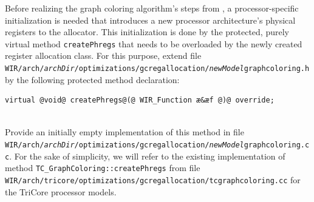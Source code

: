 Before realizing the graph coloring algorithm's steps from , a processor-specific initialization is needed that introduces a new processor architecture's physical registers to the allocator.
This initialization is done by the protected, purely virtual method \texttt{createPhregs} that needs to be overloaded by the newly created register allocation class.
For this purpose, extend file \texttt{WIR/arch/{\itshape archDir}/optimizations/gcregallocation/{\itshape newModel}\-graphcoloring.h} by the following protected method declaration: \\
\begin{lstlisting}[style=code,float=!ht,aboveskip=-0.8 \baselineskip,belowskip=-0.8 \baselineskip]
virtual @void@ createPhregs@(@ WIR_Function æ&æf @)@ override;
\end{lstlisting}
\\
Provide an initially empty implementation of this method in file \texttt{WIR/arch/{\itshape archDir}/optimizations/gcreg\-allo\-cation/{\itshape newModel}graphcoloring.cc}.
For the sake of simplicity, we will refer to the existing implementation of method \texttt{TC\_GraphColoring::createPhregs} from file \texttt{WIR/arch/tricore/optimizations/gcreg\-allo\-cation/tcgraphcoloring.cc} for the TriCore processor models.

